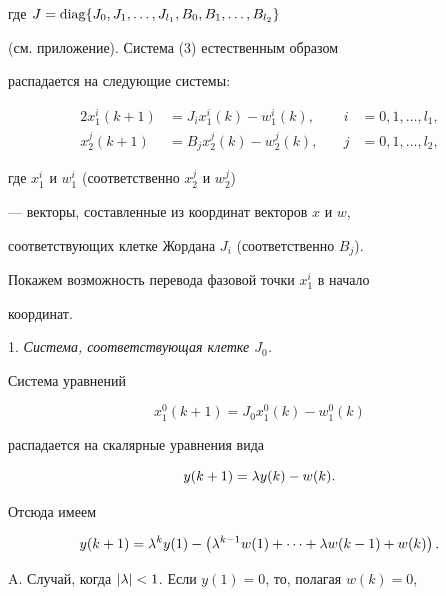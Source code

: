 где $J=\operatorname{diag}\{J_0, J_1, \dotsc, J_{l_1}, B_0, B_1, \dotsc, B_{l_2}\}$


(см. приложение). Система (3) естественным образом


распадается на следующие системы:


\begin{alignat}{2}


x_1^i(k+1) &= J_ix_1^i(k) - w_1^i(k), &\quad i&=0,1,\dotsc,l_1, \\


%


x_2^j(k+1) &= B_jx_2^j(k) - w_2^j(k), &\quad j&=0,1,\dotsc,l_2,


\end{alignat}


где $x_1^i$ и $w_1^i$ (соответственно $x_2^j $ и $w_2^j $)


--- векторы, составленные из координат векторов $x$ и $w$,


соответствующих клетке Жордана $J_i $ (соответственно $B_j$).





Покажем возможность перевода фазовой точки $x_1^i $ в начало


координат.


\medskip





1. {\it Система, соответствующая клетке $J_0$.}


Система уравнений


\begin{equation}


x_1^0(k+1) = J_0x_1^0(k) - w_1^0(k)


\end{equation}


распадается на скалярные уравнения вида


$$


y(k+1) = \l y(k) - w(k).


$$


Отсюда имеем


\begin{equation}


y(k+1) = \l^ky(1) -\left(\l^{k-1}w(1)+\dotsb+ \l w(k-1)+w(k)\right).


\end{equation}





A. Случай, когда $|{\lambda}|<1$. Если $y(1)=0$, то, полагая $w(k) =0$,


